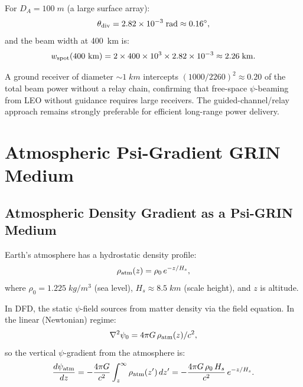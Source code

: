 \documentclass[aps,prd,twocolumn,superscriptaddress]{revtex4-2}
\begin{document}
For $D_A = 100\;\si{m}$ (a large surface array):
\begin{equation}
\theta_{\rm div} = 2.82\times10^{-3}\;\si{rad} \approx 0.16^\circ,
\end{equation}
and the beam width at 400~km is:
\begin{equation}
w_{\rm spot}(400~\text{km}) = 2 \times 400 \times 10^3 \times 2.82\times10^{-3}
\approx 2.26\;\si{km}.
\end{equation}

A ground receiver of diameter $\sim 1\;\si{km}$ intercepts
$(1000/2260)^2 \approx 0.20$ of the total beam power without a relay
chain, confirming that free-space $\psi$-beaming from LEO without
guidance requires large receivers.  The guided-channel/relay approach
remains strongly preferable for efficient long-range power delivery.

\section{Atmospheric Psi-Gradient GRIN Medium}
\label{sec:atm-grin}

\subsection{Atmospheric Density Gradient as a Psi-GRIN Medium}

Earth's atmosphere has a hydrostatic density profile:
\begin{equation}
\rho_{\rm atm}(z) = \rho_0\,e^{-z/H_s},
\label{eq:atm-density}
\end{equation}
where $\rho_0 = 1.225\;\si{kg/m^3}$ (sea level), $H_s \approx 8.5\;\si{km}$
(scale height), and $z$ is altitude.

In DFD, the static $\psi$-field sources from matter density via the
field equation.  In the linear (Newtonian) regime:
\begin{equation}
\nabla^2\psi_0 = 4\pi G\,\rho_{\rm atm}(z)/c^2,
\label{eq:psi-eq}
\end{equation}
so the vertical $\psi$-gradient from the atmosphere is:
\begin{equation}
\frac{d\psi_{\rm atm}}{dz} = -\frac{4\pi G}{c^2}\int_z^\infty
\rho_{\rm atm}(z')\,dz' = -\frac{4\pi G\,\rho_0\,H_s}{c^2}\,e^{-z/H_s}.
\label{eq:dpsi-dz}
\end{equation}
\end{document}
